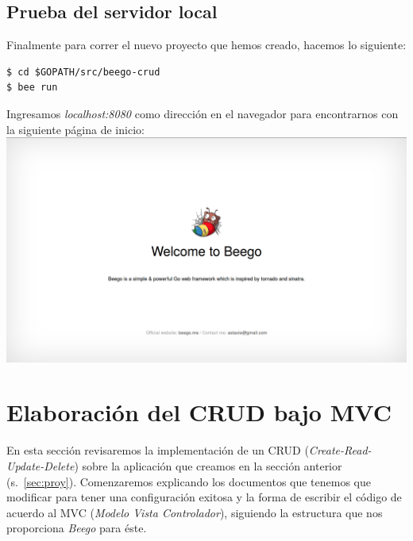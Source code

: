 \documentclass[12pt]{article}
\begin{document}
\subsection{Prueba del servidor local}
\noindent Finalmente para correr el nuevo proyecto que hemos creado, hacemos lo siguiente:
\begin{verbatim}
$ cd $GOPATH/src/beego-crud
$ bee run
\end{verbatim}
\noindent Ingresamos \textit{localhost:8080} como dirección en el navegador para encontrarnos con la siguiente página de inicio: \\

\includegraphics[scale=0.25]{beego.png}
\newpage

\section{Elaboración del CRUD bajo MVC}
En esta sección revisaremos la implementación de un CRUD (\textit{Create-Read-Update-Delete}) sobre la aplicación que creamos en la sección anterior (s.~\ref{sec:proy}). Comenzaremos explicando los documentos que tenemos que modificar para tener una configuración exitosa y la forma de escribir el código de acuerdo al MVC (\textit{Modelo Vista Controlador}), siguiendo la estructura que nos proporciona \textit{Beego} para éste.
\end{document}
